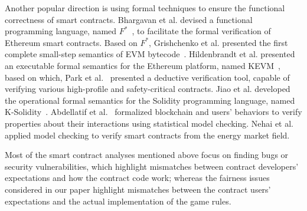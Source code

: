Another popular direction is using formal techniques to ensure the functional correctness of smart
contracts.
Bhargavan et al. devised a functional programming language, named $F^*$~\cite{bhargavan2016formal},
to facilitate the formal verification of Ethereum smart contracts.
Based on $F^*$, Grishchenko et al. presented the first complete small-step semantics of EVM
bytecode~\cite{grishchenko2018semantic}.
Hildenbrandt et al. presented an executable formal semantics for the Ethereum platform, named
KEVM~\cite{hildenbrandt2017kevm}, based on which, Park et al.~\cite{park2018formal} presented a
deductive verification tool, capable of verifying various high-profile and safety-critical
contracts.
Jiao et al. developed the operational formal semantics for the Solidity programming language, named K-Solidity~\cite{JKL20, JLS20}. Abdellatif et al.~\cite{abdellatif2018formal} formalized blockchain and users' behaviors to verify
properties about their interactions using statistical model checking.
Nehai et al.~\cite{nehai2018model} applied model checking to verify smart contracts from the energy market field.

Most of the smart contract analyses mentioned above focus on finding bugs or security
vulnerabilities, which highlight mismatches between contract developers' expectations and how the
contract code work; whereas the fairness issues considered in our paper highlight mismatches
between the contract users' expectations and the actual implementation of the game rules.



